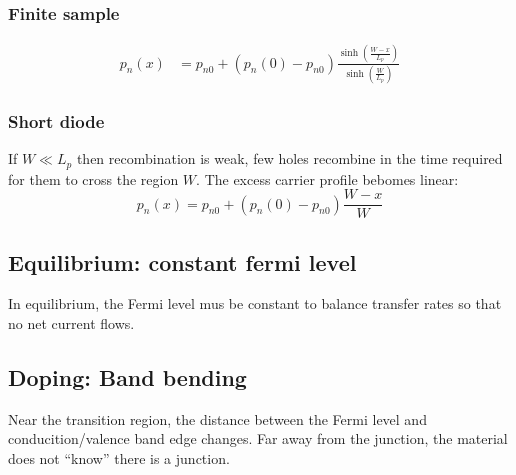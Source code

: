 \documentclass[a4paper, fontsize=8pt, landscape, DIV=1]{scrartcl}
\begin{document}
\begin{multicols*}{4}
    \subsubsection{Finite sample}
    \begin{align*}
      p_n(x) &= p_{n0} + (p_n(0)-p_{n0}) \frac{\sinh\left(\frac{W-x}{L_p}\right)}{\sinh\left(\frac{W}{L_p}\right)}
    \end{align*}
    
    \subsubsection{Short diode}
    If $W \ll L_p$ then recombination is weak, few holes recombine in the time required for them to cross the region $W$.
    The excess carrier profile bebomes linear:
    \[p_n(x) = p_{n0} + (p_n(0)-p_{n0})\frac{W-x}{W}\]

  \subsection{Equilibrium: constant fermi level}
  In equilibrium, the Fermi level mus be constant to balance transfer rates so that no net current flows.


  \subsection{Doping: Band bending}
  Near the transition region, the distance between the Fermi level and conducition/valence band edge changes.
  Far away from the junction, the material does not ``know'' there is a junction.


\end{multicols*}
\end{document}
